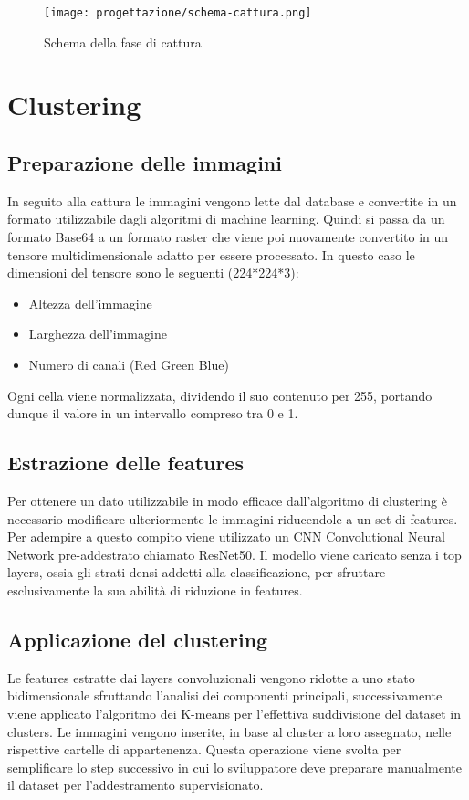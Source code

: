 \begin{figure}[!h] 
  \centering 
  \texttt{[image: progettazione/schema-cattura.png]} 
  \caption{Schema della fase di cattura}
  \label{fig:schema-cattura}
\end{figure}

\newpage

\section{Clustering}
\subsection{Preparazione delle immagini}
In seguito alla cattura le immagini vengono lette dal database e convertite in un formato utilizzabile dagli algoritmi di machine learning.
Quindi si passa da un formato Base64 a un formato raster che viene poi nuovamente convertito in un tensore multidimensionale adatto per essere processato.
In questo caso le dimensioni del tensore sono le seguenti (224*224*3):
\begin{itemize}
  \item Altezza dell'immagine
  \item Larghezza dell'immagine 
  \item Numero di canali (Red Green Blue)
\end{itemize} 
Ogni cella viene normalizzata, dividendo il suo contenuto per 255, portando dunque il valore in un intervallo compreso tra 0 e 1.

\subsection{Estrazione delle features}
Per ottenere un dato utilizzabile in modo efficace dall'algoritmo di clustering è necessario modificare ulteriormente le immagini riducendole a un set di features.
Per adempire a questo compito viene utilizzato un CNN Convolutional Neural Network pre-addestrato chiamato ResNet50.
Il modello viene caricato senza i top layers, ossia gli strati densi addetti alla classificazione, per sfruttare esclusivamente la sua abilità di riduzione in features.

\subsection{Applicazione del clustering}
Le features estratte dai layers convoluzionali vengono ridotte a uno stato bidimensionale sfruttando l'analisi dei componenti principali, successivamente viene applicato l'algoritmo dei K-means per l'effettiva suddivisione del dataset in clusters.
Le immagini vengono inserite, in base al cluster a loro assegnato, nelle rispettive cartelle di appartenenza.
Questa operazione viene svolta per semplificare lo step successivo in cui lo sviluppatore deve preparare manualmente il dataset per l'addestramento supervisionato.

